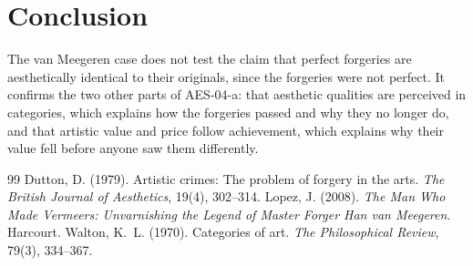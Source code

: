 \documentclass{situationist-preprint}
\begin{document}
\section{Conclusion}

The van Meegeren case does not test the claim that perfect forgeries are aesthetically identical to their originals, since the forgeries were not perfect. It confirms the two other parts of AES-04-a: that aesthetic qualities are perceived in categories, which explains how the forgeries passed and why they no longer do, and that artistic value and price follow achievement, which explains why their value fell before anyone saw them differently.

\begin{thebibliography}{99}\small
{} Dutton, D. (1979). Artistic crimes: The problem of forgery in the arts. \emph{The British Journal of Aesthetics}, 19(4), 302--314.
 Lopez, J. (2008). \emph{The Man Who Made Vermeers: Unvarnishing the Legend of Master Forger Han van Meegeren}. Harcourt.
 Walton, K.~L. (1970). Categories of art. \emph{The Philosophical Review}, 79(3), 334--367.
\end{thebibliography}
\end{document}
